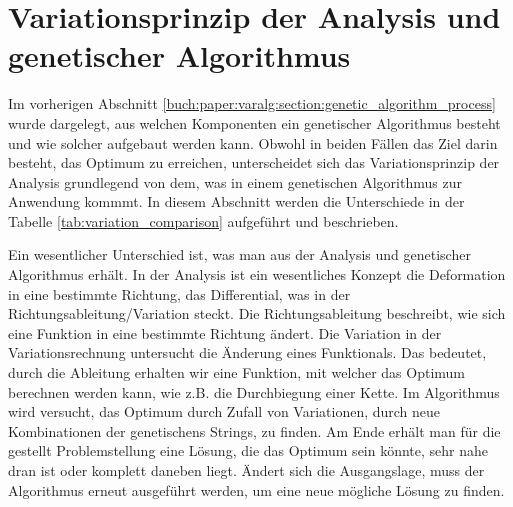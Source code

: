 %
%
%
%
\section{Variationsprinzip der Analysis und genetischer Algorithmus
\label{buch:paper:varalg:section:variations_analysis_algorithm_result}}
Im vorherigen Abschnitt \ref{buch:paper:varalg:section:genetic_algorithm_process} 
wurde dargelegt, aus welchen Komponenten ein genetischer Algorithmus besteht und wie 
solcher aufgebaut werden kann. 
Obwohl in beiden Fällen das Ziel darin besteht, das Optimum zu erreichen, unterscheidet
sich das Variationsprinzip der Analysis grundlegend von dem, was in einem genetischen 
Algorithmus zur Anwendung kommmt. In diesem Abschnitt werden die Unterschiede in der 
Tabelle \ref{tab:variation_comparison} aufgeführt und beschrieben.

Ein wesentlicher Unterschied ist, was man aus der Analysis und genetischer Algorithmus
erhält. In der Analysis ist ein wesentliches Konzept die Deformation in eine bestimmte
Richtung, das Differential, was in der Richtungsableitung/Variation steckt. Die Richtungsableitung
beschreibt, wie sich eine Funktion in eine bestimmte Richtung ändert. Die Variation in 
der Variationsrechnung untersucht die Änderung eines Funktionals. Das bedeutet, durch die Ableitung
erhalten wir eine Funktion, mit welcher das Optimum berechnen werden kann, wie z.B. die 
Durchbiegung einer Kette. Im Algorithmus wird versucht, das Optimum durch Zufall von  
Variationen, durch neue Kombinationen der genetischens Strings, zu finden. Am
Ende erhält man für die gestellt Problemstellung eine Lösung, die das Optimum sein könnte, 
sehr nahe dran ist oder komplett daneben liegt. Ändert sich die Ausgangslage, muss der Algorithmus
erneut ausgeführt werden, um eine neue mögliche Lösung zu finden.

